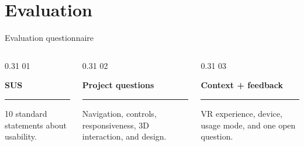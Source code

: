 \section{Evaluation}
\begin{frame}[c]{Evaluation questionnaire}
\begin{columns}[T,onlytextwidth]
  \begin{column}{0.31\textwidth}
    \textcolor{unired}{\LARGE 01}

    \vspace{0.08cm}
    \parbox[t][0.82cm][t]{\linewidth}{\large\bfseries SUS}

    \vspace{0.04cm}
    \color{unimint}\rule{\linewidth}{1.6pt}
    \color{black}

    \vspace{0.24cm}
    \large
    10 standard statements about usability.
  \end{column}

  \begin{column}{0.31\textwidth}
    \textcolor{unired}{\LARGE 02}

    \vspace{0.08cm}
    \parbox[t][0.82cm][t]{\linewidth}{\large\bfseries Project questions}

    \vspace{0.04cm}
    \color{unimint}\rule{\linewidth}{1.6pt}
    \color{black}

    \vspace{0.24cm}
    \large
    Navigation, controls, responsiveness, 3D interaction, and design.
  \end{column}

  \begin{column}{0.31\textwidth}
    \textcolor{unired}{\LARGE 03}

    \vspace{0.08cm}
    \parbox[t][0.82cm][t]{\linewidth}{\large\bfseries Context + feedback}

    \vspace{0.04cm}
    \color{unimint}\rule{\linewidth}{1.6pt}
    \color{black}

    \vspace{0.24cm}
    \large
    VR experience, device, usage mode, and one open question.
  \end{column}
\end{columns}

\end{frame}
